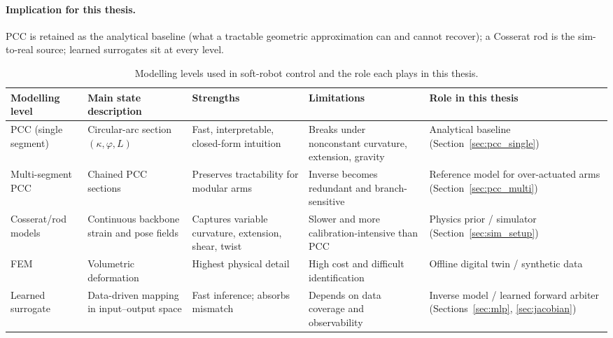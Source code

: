 \paragraph{Implication for this thesis.}
PCC is retained as the analytical baseline (what a tractable geometric approximation can and cannot recover); a Cosserat rod is the sim-to-real source; learned surrogates sit at every level.

\begin{table}[ht]
\centering
\caption[Modelling levels used in soft-robot control.]{Modelling levels used in soft-robot control and the role each plays in this thesis.}
\label{tab:bg_models}
\begin{tabularx}{\linewidth}{@{}l X X X X@{}}
\toprule
Modelling level        & Main state description                         & Strengths                                              & Limitations                                                  & Role in this thesis \\
\midrule
PCC (single segment)   & Circular-arc section $(\kappa, \varphi, L)$     & Fast, interpretable, closed-form intuition             & Breaks under nonconstant curvature, extension, gravity        & Analytical baseline (Section~\ref{sec:pcc_single}) \\
Multi-segment PCC      & Chained PCC sections                            & Preserves tractability for modular arms                 & Inverse becomes redundant and branch-sensitive                & Reference model for over-actuated arms (Section~\ref{sec:pcc_multi}) \\
Cosserat/rod models    & Continuous backbone strain and pose fields      & Captures variable curvature, extension, shear, twist    & Slower and more calibration-intensive than PCC                & Physics prior / simulator (Section~\ref{sec:sim_setup}) \\
FEM                    & Volumetric deformation                          & Highest physical detail                                 & High cost and difficult identification                        & Offline digital twin / synthetic data \\
Learned surrogate      & Data-driven mapping in input--output space      & Fast inference; absorbs mismatch                        & Depends on data coverage and observability                    & Inverse model / learned forward arbiter (Sections~\ref{sec:mlp}, \ref{sec:jacobian}) \\
\bottomrule
\end{tabularx}
\end{table}

